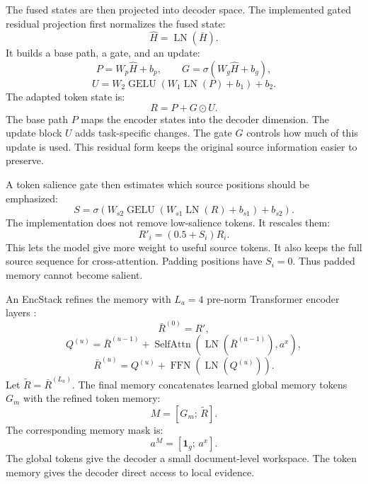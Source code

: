 \documentclass[11pt]{article}
\begin{document}
The fused states are then projected into decoder space.
The implemented gated residual projection first normalizes the fused state:
\begin{equation}
\hat{H}=\operatorname{LN}(\bar{H}).
\end{equation}
It builds a base path, a gate, and an update:
\begin{equation}
P=W_p\hat{H}+b_p,
\qquad
G=\sigma(W_g\hat{H}+b_g),
\end{equation}
\begin{equation}
U=W_2\operatorname{GELU}(W_1\operatorname{LN}(P)+b_1)+b_2.
\end{equation}
The adapted token state is:
\begin{equation}
R=P+G\odot U.
\end{equation}
The base path $P$ maps the encoder states into the decoder dimension.
The update block $U$ adds task-specific changes.
The gate $G$ controls how much of this update is used.
This residual form keeps the original source information easier to preserve.

A token salience gate then estimates which source positions should be emphasized:
\begin{equation}
S=\sigma(W_{s2}\operatorname{GELU}(W_{s1}\operatorname{LN}(R)+b_{s1})+b_{s2}).
\end{equation}
The implementation does not remove low-salience tokens.
It rescales them:
\begin{equation}
R'_i=(0.5+S_i)R_i.
\end{equation}
This lets the model give more weight to useful source tokens.
It also keeps the full source sequence for cross-attention.
Padding positions have $S_i=0$.
Thus padded memory cannot become salient.

An EncStack refines the memory with $L_a=4$ pre-norm Transformer encoder layers \citep{vaswani2017attention}:
\begin{equation}
\bar{R}^{(0)}=R',
\end{equation}
\begin{equation}
Q^{(u)}=\bar{R}^{(u-1)}
+\operatorname{SelfAttn}(\operatorname{LN}(\bar{R}^{(u-1)}),a^x),
\end{equation}
\begin{equation}
\bar{R}^{(u)}=Q^{(u)}
+\operatorname{FFN}(\operatorname{LN}(Q^{(u)})).
\end{equation}
Let $\tilde{R}=\bar{R}^{(L_a)}$.
The final memory concatenates learned global memory tokens $G_m$ with the refined token memory:
\begin{equation}
M=[G_m;\,\tilde{R}].
\end{equation}
The corresponding memory mask is:
\begin{equation}
a^M=[\mathbf{1}_g;\,a^x].
\end{equation}
The global tokens give the decoder a small document-level workspace.
The token memory gives the decoder direct access to local evidence.
\end{document}
